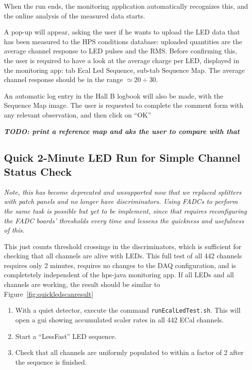 \documentclass[12pt]{article}
\begin{document}
When the run ends, the monitoring application automatically recognizes this, and the online analysis of the measured data starts. 

A pop-up will appear, asking the user if he wants to upload the LED data that has been measured to the HPS conditions database: uploaded quantities are the average channel response to LED pulses and the RMS. Before confirming this, the user is required to have a look at the average charge per LED, displayed in the monitoring app: tab Ecal Led Sequence, sub-tab Sequence Map. The average channel response should be in the range $\simeq 20 \div 30$. 

An automatic log entry in the Hall B logbook will also be made, with the Sequence Map image. The user is requested to complete the comment form with any relevant observation, and then click on ``OK''

{\bf {\it TODO: print a reference map and aks the user to compare with that}}

\subsection{Quick 2-Minute LED Run for Simple Channel Status Check}
{\em Note, this has become deprecated and unsupported now that we replaced splitters with
patch panels and no longer have discriminators.  Using FADCs to perform the same task is
possible but yet to be implement, since that requires reconfiguring the FADC boards'
thresholds every time and lessens the quickness and usefulness of this.}

This just counts threshold crossings in the discriminators, which is sufficient for checking that all channels are alive with LEDs.  This full test of all 442 channels requires only 2 minutes, requires no changes to the DAQ configuration, and is completetely independent of the hps-java monitoring app.  If all LEDs and all channels are working, the result should be similar to Figure~\ref{fig:quickledscanresult}

  \begin{enumerate}
      \item With a quiet detector, execute the command \texttt{runEcalLedTest.sh}.  This will open a gui showing accumulated scaler rates in all 442 ECal channels.  
      \item Start a ``LessFast'' LED sequence.
      \item Check that all channels are uniformly populated to within a factor of 2 after the sequence is finished.
  \end{enumerate}
\end{document}
